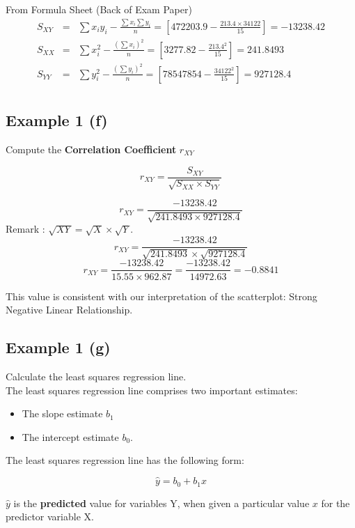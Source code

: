 \documentclass[]{report}
\begin{document}
\bigskip
From Formula Sheet (Back of Exam Paper)
\begin{eqnarray*}
	S_{XY} &=&
	\sum x_iy_i - \frac{\sum x_i\sum y_i}{n} = \left[472203.9 - \frac{213.4 \times 34122}{15} \right]=  -13238.42\\
	S_{XX} &=&
	\sum x_i^2 - \frac{(\sum x_i)^2}{n} = \left[3277.82 - \frac{213.4^2}{15}\right] =  241.8493\\
	S_{YY} &=&
	\sum y_i^2 - \frac{(\sum y_i)^2}{n} = \left[78547854 - \frac{34122^2}{15}\right] = 927128.4\\
\end{eqnarray*}




\subsection{Example 1 (f)}
Compute the \textbf{Correlation Coefficient} $r_{XY}$

\[r_{XY} =  \frac{S_{XY}}{\sqrt{S_{XX} \times S_{YY}}} \]

\[r_{XY} =  \frac{-13238.42}{\sqrt{241.8493 \times 927128.4}} \]
Remark : $\sqrt{XY} = \sqrt{X} \times \sqrt{Y}$.
\[r_{XY} =  \frac{-13238.42}{\sqrt{241.8493} \times \sqrt{927128.4}} \]
\[r_{XY} =  \frac{-13238.42}{15.55 \times 962.87} = \frac{-13238.42}{14972.63} = -0.8841 \]

This value is consistent with our interpretation of the scatterplot: Strong Negative Linear Relationship.



\subsection{Example 1 (g)}
Calculate the least squares regression line.\\
\bigskip
The least squares regression line comprises two important estimates:
\begin{itemize}
	\item  The slope estimate $b_1$
	\item  The intercept estimate $b_0$.
\end{itemize}
The least squares regression line has the following form:

\[ \hat{y}  = b_0 + b_1x \]

$\hat{y}$ is the \textbf{predicted} value for variables Y, when given a particular value $x$ for the predictor variable X.
\end{document}
